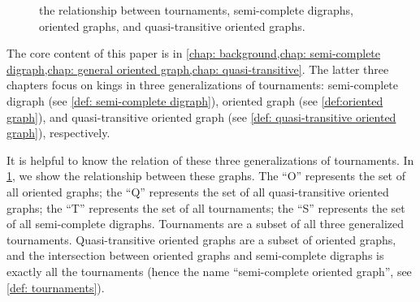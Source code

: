 \begin{figure}
  \centering
  \caption{the relationship between tournaments,
    semi-complete digraphs, oriented graphs,
    and quasi-transitive oriented graphs.}
  \label{fig: generalized tournaments relationship}  %
\end{figure}

The core content of this paper is in
\cref{chap: background,chap: semi-complete digraph,chap: general oriented graph,chap: quasi-transitive}.
The latter three chapters focus on kings in
three generalizations of tournaments:
semi-complete digraph (see \cref{def: semi-complete digraph}),
oriented graph (see \cref{def:oriented graph}),
and quasi-transitive oriented graph
(see \cref{def: quasi-transitive oriented graph}),
respectively.

It is helpful to know the relation of these
three generalizations of tournaments.
In \cref{fig: generalized tournaments relationship},
we show the relationship between these graphs.
The ``O'' represents the set of all oriented graphs;
the ``Q'' represents the set of all quasi-transitive oriented graphs;
the ``T'' represents the set of all tournaments;
the ``S'' represents the set of all semi-complete digraphs.
Tournaments are a subset of all three generalized tournaments.
Quasi-transitive oriented graphs are a subset of oriented graphs,
and the intersection between oriented graphs and
semi-complete digraphs is exactly all the tournaments
(hence the name ``semi-complete oriented graph'',
see \cref{def: tournaments}).


